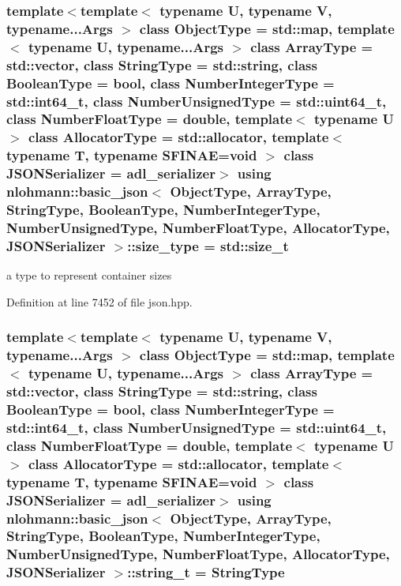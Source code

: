 \subsubsection[{\texorpdfstring{size\+\_\+type}{size_type}}]{\setlength{\rightskip}{0pt plus 5cm}template$<$template$<$ typename U, typename V, typename...\+Args $>$ class Object\+Type = std\+::map, template$<$ typename U, typename...\+Args $>$ class Array\+Type = std\+::vector, class String\+Type  = std\+::string, class Boolean\+Type  = bool, class Number\+Integer\+Type  = std\+::int64\+\_\+t, class Number\+Unsigned\+Type  = std\+::uint64\+\_\+t, class Number\+Float\+Type  = double, template$<$ typename U $>$ class Allocator\+Type = std\+::allocator, template$<$ typename T, typename S\+F\+I\+N\+A\+E=void $>$ class J\+S\+O\+N\+Serializer = adl\+\_\+serializer$>$ using {\bf nlohmann\+::basic\+\_\+json}$<$ Object\+Type, Array\+Type, String\+Type, Boolean\+Type, Number\+Integer\+Type, Number\+Unsigned\+Type, Number\+Float\+Type, Allocator\+Type, J\+S\+O\+N\+Serializer $>$\+::{\bf size\+\_\+type} =  std\+::size\+\_\+t}\hypertarget{classnlohmann_1_1basic__json_a39f2cd0b58106097e0e67bf185cc519b}{}\label{classnlohmann_1_1basic__json_a39f2cd0b58106097e0e67bf185cc519b}


a type to represent container sizes 



Definition at line 7452 of file json.\+hpp.

\subsubsection[{\texorpdfstring{string\+\_\+t}{string_t}}]{\setlength{\rightskip}{0pt plus 5cm}template$<$template$<$ typename U, typename V, typename...\+Args $>$ class Object\+Type = std\+::map, template$<$ typename U, typename...\+Args $>$ class Array\+Type = std\+::vector, class String\+Type  = std\+::string, class Boolean\+Type  = bool, class Number\+Integer\+Type  = std\+::int64\+\_\+t, class Number\+Unsigned\+Type  = std\+::uint64\+\_\+t, class Number\+Float\+Type  = double, template$<$ typename U $>$ class Allocator\+Type = std\+::allocator, template$<$ typename T, typename S\+F\+I\+N\+A\+E=void $>$ class J\+S\+O\+N\+Serializer = adl\+\_\+serializer$>$ using {\bf nlohmann\+::basic\+\_\+json}$<$ Object\+Type, Array\+Type, String\+Type, Boolean\+Type, Number\+Integer\+Type, Number\+Unsigned\+Type, Number\+Float\+Type, Allocator\+Type, J\+S\+O\+N\+Serializer $>$\+::{\bf string\+\_\+t} =  String\+Type}\hypertarget{classnlohmann_1_1basic__json_a61f8566a1a85a424c7266fb531dca005}{}\label{classnlohmann_1_1basic__json_a61f8566a1a85a424c7266fb531dca005}


